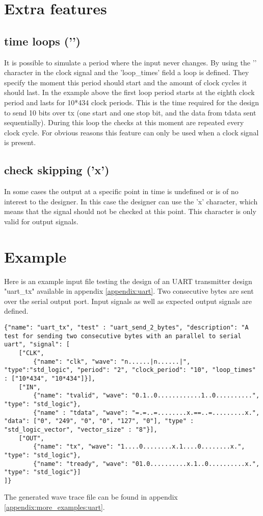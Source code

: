 \section{Extra features}
\subsection{time loops ('\textbar')}
It is possible to simulate a period where the input never changes. By using the '\textbar' character in the clock signal and the 'loop\_times' field a loop is defined. They specify the moment this period should start and the amount of clock cycles it should last. In the example above the first loop period starts at the eighth clock period and lasts for 10*434 clock periods. This is the time required for the design to send 10 bits over tx (one start and one stop bit, and the data from tdata sent sequentially). During this loop the checks at this moment are repeated every clock cycle. For obvious reasons this feature can only be used when a clock signal is present.
\subsection{check skipping ('x')}
In some cases the output at a specific point in time is undefined or is of no interest to the designer. In this case the designer can use the 'x' character, which means that the signal should not be checked at this point. This character is only valid for output signals.\newpage
\section{Example}
Here is an example input file testing the design of an UART transmitter design "uart\_tx" available in appendix \ref{appendix:uart}. Two consecutive bytes are sent over the serial output port. Input signals as well as expected output signals are defined.
\begin{lstlisting}[style=json, caption={}, label={}]
{"name": "uart_tx", "test" : "uart_send_2_bytes", "description": "A test for sending two consecutive bytes with an parallel to serial uart", "signal": [
	["CLK",
		{"name": "clk", "wave": "n......|n......|", "type":"std_logic", "period": "2", "clock_period": "10", "loop_times" : ["10*434", "10*434"]}],
	["IN",
		{"name": "tvalid", "wave": "0.1..0............1..0..........", "type": "std_logic"},
		{"name" : "tdata", "wave": "=.=..=........x.==..=.........x.", "data": ["0", "249", "0", "0", "127", "0"], "type" : "std_logic_vector", "vector_size" : "8"}],
	["OUT",
		{"name": "tx", "wave": "1....0........x.1....0........x.", "type": "std_logic"},
		{"name": "tready", "wave": "01.0..........x.1..0..........x.", "type": "std_logic"}]
]}
\end{lstlisting}
The generated wave trace file can be found in appendix \ref{appendix:more_examples:uart}.\newpage
\newpage
